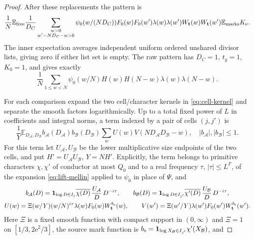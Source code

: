 \documentclass[11pt]{article}
\theoremstyle{definition}
\newcommand{\E}{\mathbb E}
\newcommand{\ind}{\mathbf 1}
\newcommand{\wt}{W_{\mathbf t}}
\theoremstyle{remark}
\begin{document}
\begin{proof}
After these replacements the pattern is
\begin{equation}\label{eq:factored-pattern}
\frac1N\E_{\rm free}\frac1{D_C}
\sum_{\substack{w>0\\w'=ND_C-w>0}}
 \psi_0(w/(ND_C))F_0(w)F_0(w')
 \lambda(w)\lambda(w')\wt(w)\wt(w')
 \E_{\rm marks}K_\nu .
\end{equation}
The inner expectation averages independent uniform ordered unshared
divisor lists, giving zero if either list set is empty.
The raw pattern has $D_C=1$, $t_g=1$, $K_0=1$, and gives exactly
\begin{equation}\label{eq:primitive-pattern}
\frac1N\sum_{1\le w<N}\psi_0(w/N)
H(w)H(N-w)\lambda(w)\lambda(N-w).
\end{equation}

For each comparison expand the two cell/character kernels in
\eqref{eq:cell-kernel} and separate the smooth factors logarithmically.
Up to a total fixed power of $L$ in coefficients and integral norms,
a term indexed by a pair of cells $(j,j')$ is
\begin{equation}\label{eq:comparison-term}
\frac1Y\E_{D_{\mathcal A},D_{\mathcal B}}
 b_{\mathcal A}(D_{\mathcal A})b_{\mathcal B}(D_{\mathcal B})
 \sum_w U(w)V(ND_{\mathcal A}D_{\mathcal B}-w),
\quad |b_{\mathcal A}|,|b_{\mathcal B}|\le1.
\end{equation}
For this term let $U_{\mathcal A},U_{\mathcal B}$ be the lower
multiplicative size endpoints of the two cells, and put
$H'=U_{\mathcal A}U_{\mathcal B}$, $Y=NH'$.
Explicitly, the term belongs to primitive characters $\chi,\chi'$ of
conductor at most $Q_0$ and to a real frequency $\tau$, $|\tau|\le L^F$,
of the expansion \eqref{eq:lift-mellin} applied to $\psi_0$ in place of
$\Psi$, and
\begin{equation}\label{eq:comparison-data}
\begin{gathered}
b_{\mathcal A}(D)=\ind_{\log D\in I_j}\overline{\chi(D)}\,
 \frac{U_{\mathcal A}}{D}\,D^{-i\tau},\qquad
b_{\mathcal B}(D)=\ind_{\log D\in I_{j'}}\overline{\chi'(D)}\,
 \frac{U_{\mathcal B}}{D}\,D^{-i\tau},\\
U(w)=\Xi(w/Y)(w/N)^{i\tau}\lambda(w)F_0(w)W_{\mathbf t}^{b_{\rm s}}(w),\qquad
V(w')=\Xi(w'/Y)\lambda(w')F_0(w')W_{\mathbf t}^{b_{\rm t}}(w').
\end{gathered}
\end{equation}
Here $\Xi$ is a fixed smooth function with compact support in
$(0,\infty)$ and $\Xi=1$ on $[1/3,2\mathrm e^2/3]$, the source mark
function is
$b_{\rm s}=\ind_{\log X_{\mathcal B}\in I_{j'}}\chi'(X_{\mathcal B})$, and

\end{proof}
\end{document}
